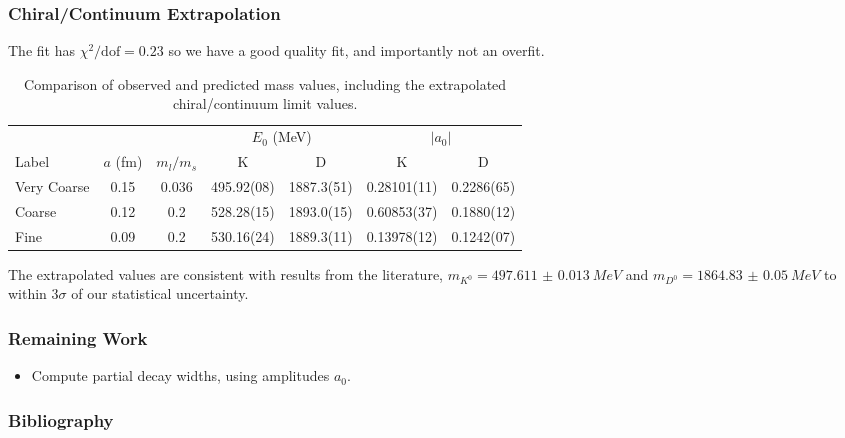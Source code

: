 \documentclass{beamer}
\begin{document}
\begin{frame}
    \frametitle{Chiral/Continuum Extrapolation}
    The fit has $\chi^2 / \mathrm{dof} = 0.23$ so we have a good quality fit, and importantly not an overfit.
    \begin{table}
    \centering
    \tiny
    \begin{tabular}{l S[table-format=1.2] S[table-format=1.3] S[table-format=3.2(2)] S[table-format=4.1(2)] S[table-format=1.5(2)] S[table-format=1.4(2)]}
        \toprule
                    &                   &                   &        & \\
        \cmidrule(lr){4-5}\cmidrule(lr){6-7}
        Label       & {$a$ (\si{fm})}   & {$m_l / m_s$}     & {K}               & {D}               & {K}                & {D}\\
        \midrule
        Very Coarse & 0.15              & 0.036             & 495.92(08)        & 1887.3(51)        & 0.28101(11)        & 0.2286(65)\\
        Coarse      & 0.12              & 0.2               & 528.28(15)        & 1893.0(15)        & 0.60853(37)        & 0.1880(12)\\
        Fine        & 0.09              & 0.2               & 530.16(24)        & 1889.3(11)        & 0.13978(12)        & 0.1242(07)\\
        \bottomrule
    \end{tabular}
    \normalsize
    \caption{Comparison of observed and predicted mass values, including the extrapolated chiral/continuum limit values.\label{table:extrapolated_mass}}
    \end{table}
    The extrapolated values are consistent with results from the literature\cite{zyla2020review}, $m_{K^0} = \SI{497.611(13)}{MeV}$ and $m_{D^0} = \SI{1864.83(5)}{MeV}$ to within $3\sigma$ of our statistical uncertainty.
\end{frame}

\begin{frame}
    \frametitle{Remaining Work}
    \begin{itemize}
        \item Compute partial decay widths, using amplitudes $a_0$.
    \end{itemize}
\end{frame}

\begin{frame}
\frametitle{Bibliography}
\renewcommand*{\bibfont}{\tiny}
\printbibliography[heading=none]
\end{frame}
\end{document}
